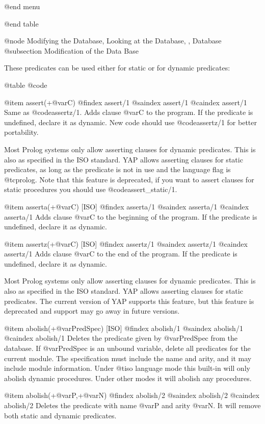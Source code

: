{{{{{{@end menu

@end table

@node Modifying the Database, Looking at the Database, , Database
@subsection Modification of the Data Base

These predicates can be used either for static or for dynamic
predicates:

@table @code

@item assert(+@var{C})
@findex assert/1
@saindex assert/1
@caindex assert/1
 Same as @code{assertz/1}. Adds clause @var{C} to the program. If the predicate is undefined,
declare it as dynamic. New code should use @code{assertz/1} for better portability.

 Most Prolog systems only allow asserting clauses for dynamic
predicates. This is also as specified in the ISO standard. YAP allows
asserting clauses for static predicates, as long as the predicate is not
in use and the language flag is @t{cprolog}. Note that this feature is
deprecated, if you want to assert clauses for static procedures you
should use @code{assert_static/1}.

@item asserta(+@var{C}) [ISO]
@findex asserta/1
@saindex asserta/1
@caindex asserta/1
 Adds clause @var{C} to the beginning of the program. If the predicate is
undefined, declare it as dynamic.

@item assertz(+@var{C}) [ISO]
@findex assertz/1
@saindex assertz/1
@caindex assertz/1
 Adds clause @var{C} to the end of the program. If the predicate is
undefined, declare it as dynamic.

 Most Prolog systems only allow asserting clauses for dynamic
predicates. This is also as specified in the ISO standard. YAP allows
asserting clauses for static predicates. The current version of YAP
supports this feature, but this feature is deprecated and support may go
away in future versions.

@item abolish(+@var{PredSpec}) [ISO]
@findex abolish/1
@saindex abolish/1
@caindex abolish/1
   Deletes the predicate given by @var{PredSpec} from the database. If
@var{PredSpec} is an unbound variable, delete all predicates for the
current module. The
specification must include the name and arity, and it may include module
information. Under @t{iso} language mode this built-in will only abolish
dynamic procedures. Under other modes it will abolish any procedures. 

@item abolish(+@var{P},+@var{N})
@findex abolish/2
@saindex abolish/2
@caindex abolish/2
 Deletes the predicate with name @var{P} and arity @var{N}. It will remove
both static and dynamic predicates.

}}}}}}
